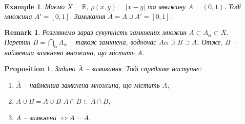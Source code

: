 \documentclass[a4paper, 10pt]{article}
\theoremstyle{theoremdd}
\theoremstyle{theoremdd}
\theoremstyle{theoremdd}
\theoremstyle{theoremdd}
\newtheorem{example}[theorem]{Example}
\theoremstyle{theoremdd}
\newtheorem{proposition}[theorem]{Proposition}
\theoremstyle{theoremdd}
\newtheorem{remark}[theorem]{Remark}
\theoremstyle{theoremdd}
\theoremstyle{theoremdd}
\begin{document}
\begin{example}
Маємо $X = \mathbb{R}$, $\rho(x,y) = |x-y|$ та множину $A = (0,1)$. Тоді множина $A' = [0,1]$. Замикання $\bar{A} = A \cup A' = [0,1]$.
\end{example}

\begin{remark}
Розглянемо зараз сукупність замкнених множин $A \subset A_{\alpha} \subset X$. Перетин $B = \displaystyle\bigcap_{\alpha} A_{\alpha}$ -- також замкнена, водночас $A\alpha \supset B \supset A$. Отже, $B$ -- найменша замкнена множина, що містить $A$.
\end{remark}

\begin{proposition}
Задано $\bar{A}$ -- замикання. Тоді спредливе наступне:
\begin{enumerate}[nosep,wide=0pt,label={\arabic*)}]
\item $\bar{A}$ -- найменша замкнена множина, що містить $A$;
\item $\overline{A \cup B} = \bar{A} \cup \bar{B}$ \qquad $\overline{A \cap B} \subset \bar{A} \cap \bar{B}$;
\item $A$ -- замкнена $\iff A = \bar{A}$.
\end{enumerate}
\end{proposition}
\end{document}
